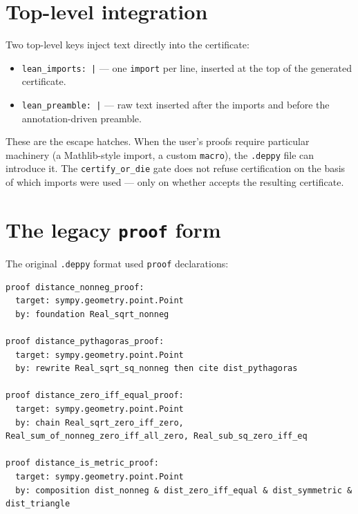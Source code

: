 \section{Top-level \Lean{} integration}
\label{sec:lean-toplevel}

Two top-level keys inject text directly into the certificate:

\begin{itemize}[leftmargin=1.7em]
  \item \texttt{lean\_imports: |} --- one \texttt{import} per line,
    inserted at the top of the generated certificate.
  \item \texttt{lean\_preamble: |} --- raw \Lean{} text inserted
    after the imports and before the annotation-driven preamble.
\end{itemize}

These are the escape hatches.  When the user's proofs require
particular \Lean{} machinery (a Mathlib-style import, a custom
\texttt{macro}), the \texttt{.deppy} file can introduce it.  The
\texttt{certify\_or\_die} gate does not refuse certification on the
basis of which imports were used --- only on whether \Lean{} accepts
the resulting certificate.

\section{The legacy \texttt{proof} form}
\label{sec:legacy-proofs}

The original \texttt{.deppy} format used \texttt{proof}
declarations:

\begin{lstlisting}[language=deppyfile,caption={Legacy \texttt{proof} form
from the SymPy sidecar.}]
proof distance_nonneg_proof:
  target: sympy.geometry.point.Point
  by: foundation Real_sqrt_nonneg

proof distance_pythagoras_proof:
  target: sympy.geometry.point.Point
  by: rewrite Real_sqrt_sq_nonneg then cite dist_pythagoras

proof distance_zero_iff_equal_proof:
  target: sympy.geometry.point.Point
  by: chain Real_sqrt_zero_iff_zero, Real_sum_of_nonneg_zero_iff_all_zero, Real_sub_sq_zero_iff_eq

proof distance_is_metric_proof:
  target: sympy.geometry.point.Point
  by: composition dist_nonneg & dist_zero_iff_equal & dist_symmetric & dist_triangle
\end{lstlisting}

